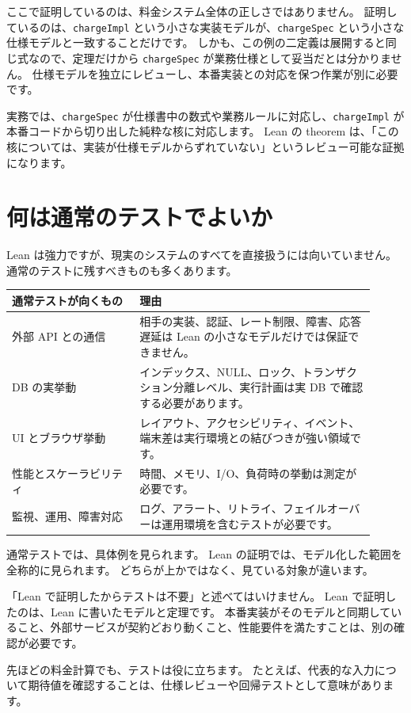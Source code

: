 ここで証明しているのは、料金システム全体の正しさではありません。
証明しているのは、\texttt{chargeImpl} という小さな実装モデルが、\texttt{chargeSpec} という小さな仕様モデルと一致することだけです。
しかも、この例の二定義は展開すると同じ式なので、定理だけから \texttt{chargeSpec} が業務仕様として妥当だとは分かりません。
仕様モデルを独立にレビューし、本番実装との対応を保つ作業が別に必要です。

実務では、\texttt{chargeSpec} が仕様書中の数式や業務ルールに対応し、\texttt{chargeImpl} が本番コードから切り出した純粋な核に対応します。
Lean の theorem は、「この核については、実装が仕様モデルからずれていない」というレビュー可能な証拠になります。

\section{何は通常のテストでよいか}

Lean は強力ですが、現実のシステムのすべてを直接扱うには向いていません。
通常のテストに残すべきものも多くあります。

\begin{longtable}{p{0.32\linewidth}p{0.59\linewidth}}
\toprule
\textbf{通常テストが向くもの} & \textbf{理由} \\
\midrule
外部 API との通信 & 相手の実装、認証、レート制限、障害、応答遅延は Lean の小さなモデルだけでは保証できません。 \\
DB の実挙動 & インデックス、NULL、ロック、トランザクション分離レベル、実行計画は実 DB で確認する必要があります。 \\
UI とブラウザ挙動 & レイアウト、アクセシビリティ、イベント、端末差は実行環境との結びつきが強い領域です。 \\
性能とスケーラビリティ & 時間、メモリ、I/O、負荷時の挙動は測定が必要です。 \\
監視、運用、障害対応 & ログ、アラート、リトライ、フェイルオーバーは運用環境を含むテストが必要です。 \\
\bottomrule
\end{longtable}

通常テストでは、具体例を見られます。
Lean の証明では、モデル化した範囲を全称的に見られます。
どちらが上かではなく、見ている対象が違います。

「Lean で証明したからテストは不要」と述べてはいけません。
Lean で証明したのは、Lean に書いたモデルと定理です。
本番実装がそのモデルと同期していること、外部サービスが契約どおり動くこと、性能要件を満たすことは、別の確認が必要です。

先ほどの料金計算でも、テストは役に立ちます。
たとえば、代表的な入力について期待値を確認することは、仕様レビューや回帰テストとして意味があります。

